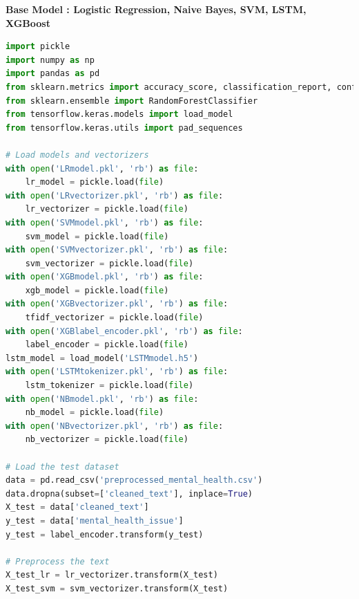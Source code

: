 \noindent
\textbf{Base Model : Logistic Regression, Naive Bayes, SVM, LSTM, XGBoost}

\begin{tcolorbox}[colback=gray!5!white, colframe=gray!80!black, boxrule=0.5pt, title=Evaluate Meta-Learner and Ensemble Model 3]
    \begin{lstlisting}[language=Python]
import pickle
import numpy as np
import pandas as pd
from sklearn.metrics import accuracy_score, classification_report, confusion_matrix
from sklearn.ensemble import RandomForestClassifier
from tensorflow.keras.models import load_model
from tensorflow.keras.utils import pad_sequences

# Load models and vectorizers
with open('LRmodel.pkl', 'rb') as file:
    lr_model = pickle.load(file)
with open('LRvectorizer.pkl', 'rb') as file:
    lr_vectorizer = pickle.load(file)
with open('SVMmodel.pkl', 'rb') as file:
    svm_model = pickle.load(file)
with open('SVMvectorizer.pkl', 'rb') as file:
    svm_vectorizer = pickle.load(file)
with open('XGBmodel.pkl', 'rb') as file:
    xgb_model = pickle.load(file)
with open('XGBvectorizer.pkl', 'rb') as file:
    tfidf_vectorizer = pickle.load(file)
with open('XGBlabel_encoder.pkl', 'rb') as file:
    label_encoder = pickle.load(file)
lstm_model = load_model('LSTMmodel.h5')
with open('LSTMtokenizer.pkl', 'rb') as file:
    lstm_tokenizer = pickle.load(file)
with open('NBmodel.pkl', 'rb') as file:
    nb_model = pickle.load(file)
with open('NBvectorizer.pkl', 'rb') as file:
    nb_vectorizer = pickle.load(file)

# Load the test dataset
data = pd.read_csv('preprocessed_mental_health.csv')
data.dropna(subset=['cleaned_text'], inplace=True)
X_test = data['cleaned_text']
y_test = data['mental_health_issue']
y_test = label_encoder.transform(y_test)

# Preprocess the text
X_test_lr = lr_vectorizer.transform(X_test)
X_test_svm = svm_vectorizer.transform(X_test)
\end{lstlisting}
\end{tcolorbox}
